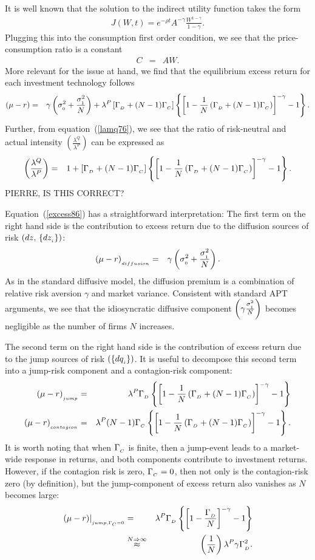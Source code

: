 \documentclass[titlepage,11pt]{article}
\def\by{\begin{eqnarray}}
\def\ey{\end{eqnarray}}
\def\nn{\nonumber}
\begin{document}
It is well known that the solution to the indirect utility function takes the form
\by
J(W,t) = e^{-\rho t} A^{-\gamma} \frac{W^{1-\gamma}}{1-\gamma}.
\ey
Plugging this into the consumption first order condition, we see that the price-consumption
ratio is a constant
\by
C &=& A W.
\ey
More relevant for the issue at hand, we find that the equilibrium excess return for each
investment technology follows
\by\label{excess86}
\left( \mu - r \right) &=& \gamma \left( \sigma\sub{0}^{2} + \frac{\sigma\sub{1}^{2}}{N} \right)
+ \lambda^{P} \left[ \Gamma\sub{D} + (N-1) \Gamma\sub{C} \right]
\left\{ \left[ 1- \frac{1}{N} \left( \Gamma\sub{D} + (N-1) \Gamma\sub{C} \right) \right]^{-\gamma} - 1 \right\}.
\ey
Further, from equation~(\ref{lamq76}), we see that the ratio of risk-neutral and actual intensity
$\left( \frac{\lambda^{Q}}{\lambda^{P}} \right)$ can be expressed as
\by
\left( \frac{\lambda^{Q}}{\lambda^{P}} \right) &=&
1 + \left[ \Gamma\sub{D} + (N-1) \Gamma\sub{C} \right]
\left\{ \left[ 1- \frac{1}{N} \left( \Gamma\sub{D} + (N-1) \Gamma\sub{C} \right) \right]^{-\gamma} - 1 \right\}.
\ey
PIERRE, IS THIS CORRECT?

Equation~(\ref{excess86}) has a straightforward interpretation:  The first term on the right
hand side is the contribution to
excess return due to the diffusion sources of risk $(dz, \, \{dz_{_{{i}}}\} )$:
\by
\left( \mu - r \right)\sub{diffusion} &=&
\gamma \left( \sigma\sub{0}^{2} + \frac{\sigma\sub{1}^{2}}{N} \right).
\ey
As in the standard diffusive model, the diffusion premium is a
combination of relative risk aversion $\gamma$ and market variance.
Consistent with standard APT arguments, we see that the idiosyncratic diffusive component
$ \left( \gamma \frac{\sigma_{_{{1}}}^{2}}{N} \right)$ becomes negligible as the number of
firms $N$ increases.

The second term on the right hand side is the contribution of
excess return due to the jump sources of risk $( \{dq_{_{{i}}}\} )$. It is useful to
decompose this second term into a jump-risk component and a contagion-risk component:
\by\label{jump_comp}
\left( \mu - r \right)\sub{jump} &=& \lambda^{P} \Gamma\sub{D}
\left\{ \left[ 1- \frac{1}{N} \left( \Gamma\sub{D} + (N-1) \Gamma\sub{C} \right) \right]^{-\gamma}
- 1 \right\}\\
%
\left( \mu - r \right)\sub{contagion} &=& \lambda^{P} (N-1) \Gamma\sub{C}
\left\{ \left[ 1- \frac{1}{N} \left( \Gamma\sub{D} + (N-1) \Gamma\sub{C} \right) \right]^{-\gamma}
- 1 \right\}.\label{cont_comp}
%
\ey
It is worth noting that when $\Gamma_{_{{C}}}$ is finite, then a jump-event leads to
a market-wide response in returns, and both components contribute to investment returns.
However, if the contagion risk is zero, $\Gamma_{_{{C}}} = 0$, then not only is the
contagion-risk zero (by definition), but the jump-component of excess return also
vanishes as $N$ becomes large:
\by
\left. \left(\mu - r\right)\right|\sub{jump, \Gamma_{C} = 0} &=& \lambda^{P} \Gamma\sub{D}
\left\{ \left[ 1- \frac{\Gamma\sub{D}}{N} \right]^{-\gamma} - 1 \right\} \nn \\
%
&\stackrel{N\Rightarrow \infty}{\approx}& \left(\frac{1}{N} \right) \lambda^{P} \gamma \Gamma^{2}\sub{D}.
\ey
\end{document}
